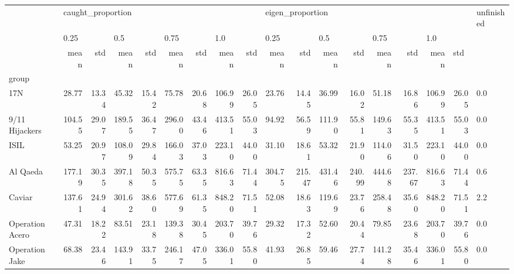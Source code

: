 \begin{tabular}{lrrrrrrrrrrrrrrrrl}
\toprule
{} & \multicolumn{8}{l}{caught\_proportion} & \multicolumn{8}{l}{eigen\_proportion} & unfinished \\
{} & \multicolumn{2}{l}{0.25} & \multicolumn{2}{l}{0.5} & \multicolumn{2}{l}{0.75} & \multicolumn{2}{l}{1.0} & \multicolumn{2}{l}{0.25} & \multicolumn{2}{l}{0.5} & \multicolumn{2}{l}{0.75} & \multicolumn{3}{l}{1.0} \\
{} &              mean &    std &    mean &    std &    mean &    std &    mean &    std &             mean &     std &    mean &     std &    mean &     std &    mean & \multicolumn{2}{l}{std} \\
group                &                   &        &         &        &         &        &         &        &                  &         &         &         &         &         &         &        &            \\
\midrule
17N                  &             28.77 &  13.34 &   45.32 &  15.42 &   75.78 &  20.68 &  106.99 &  26.05 &            23.76 &   14.45 &   36.99 &   16.02 &   51.18 &   16.86 &  106.99 &  26.05 &        0.0 \\
9/11 Hijackers       &            104.55 &  29.07 &  189.55 &  36.47 &  296.00 &  43.46 &  413.51 &  55.03 &            94.92 &   56.59 &  111.90 &   55.81 &  149.63 &   55.35 &  413.51 &  55.03 &        0.0 \\
ISIL                 &             53.25 &  20.97 &  108.09 &  29.84 &  166.03 &  37.03 &  223.10 &  44.00 &            31.10 &   18.61 &   53.32 &   21.90 &  114.06 &   31.50 &  223.10 &  44.00 &        0.0 \\
Al Qaeda             &            177.19 &  30.35 &  397.18 &  50.35 &  575.75 &  63.35 &  816.63 &  71.44 &           304.75 &  215.47 &  431.46 &  240.99 &  444.68 &  237.67 &  816.63 &  71.44 &        0.6 \\
Caviar               &            137.61 &  24.94 &  301.62 &  38.60 &  577.69 &  61.35 &  848.20 &  71.51 &            52.08 &   18.63 &  119.69 &   23.76 &  258.48 &   35.60 &  848.20 &  71.51 &        2.2 \\
Operation Acero      &             47.31 &  18.22 &   83.51 &  23.18 &  139.38 &  30.45 &  203.70 &  39.76 &            29.32 &   17.32 &   52.60 &   20.44 &   79.85 &   23.68 &  203.70 &  39.76 &        0.0 \\
Operation Jake       &             68.38 &  23.46 &  143.91 &  33.75 &  246.17 &  47.05 &  336.01 &  55.80 &            41.93 &   26.85 &   59.46 &   27.74 &  141.28 &   35.46 &  336.01 &  55.80 &        0.0 \\

\end{tabular}
